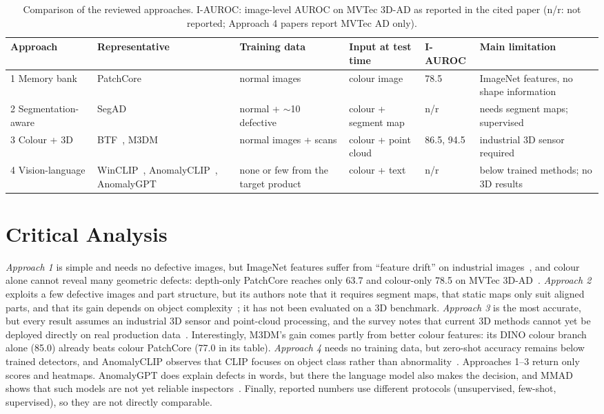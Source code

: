 \documentclass[conference]{IEEEtran}
\begin{document}
\begin{table}[t]
\centering
\caption{Comparison of the reviewed approaches. I-AUROC: image-level AUROC on MVTec 3D-AD as reported in the cited paper (n/r: not reported; Approach 4 papers report MVTec AD only).}
\label{tab:compare}
\footnotesize
\setlength{\tabcolsep}{4pt}
\begin{tabularx}{\textwidth}{@{}p{2.2cm}p{2.6cm}p{2.4cm}p{2.4cm}p{1.3cm}X@{}}
\toprule
Approach & Representative & Training data & Input at test time & I-AUROC & Main limitation \\
\midrule
1 Memory bank & PatchCore~\cite{patchcore} & normal images & colour image & 78.5~\cite{btf} & ImageNet features, no shape information \\
2 Segmentation-aware & SegAD~\cite{segad} & normal + $\sim$10 defective & colour + segment map & n/r & needs segment maps; supervised \\
3 Colour + 3D & BTF~\cite{btf}, M3DM~\cite{m3dm} & normal images + scans & colour + point cloud & 86.5, 94.5 & industrial 3D sensor required \\
4 Vision-language & WinCLIP~\cite{winclip}, AnomalyCLIP~\cite{anomalyclip}, AnomalyGPT~\cite{anomalygpt} & none or few from the target product & colour + text & n/r & below trained methods; no 3D results \\
\bottomrule
\end{tabularx}
\end{table}

\section{Critical Analysis}
\emph{Approach 1} is simple and needs no defective images, but ImageNet features suffer from ``feature drift'' on industrial images~\cite{survey}, and colour alone cannot reveal many geometric defects: depth-only PatchCore reaches only 63.7 and colour-only 78.5 on MVTec 3D-AD~\cite{btf}. \emph{Approach 2} exploits a few defective images and part structure, but its authors note that it requires segment maps, that static maps only suit aligned parts, and that its gain depends on object complexity~\cite{segad}; it has not been evaluated on a 3D benchmark. \emph{Approach 3} is the most accurate, but every result assumes an industrial 3D sensor and point-cloud processing, and the survey notes that current 3D methods cannot yet be deployed directly on real production data~\cite{survey}. Interestingly, M3DM's gain comes partly from better colour features: its DINO colour branch alone (85.0) already beats colour PatchCore (77.0 in its table). \emph{Approach 4} needs no training data, but zero-shot accuracy remains below trained detectors, and AnomalyCLIP observes that CLIP focuses on object class rather than abnormality~\cite{anomalyclip}. Approaches 1--3 return only scores and heatmaps. AnomalyGPT does explain defects in words, but there the language model also makes the decision, and MMAD shows that such models are not yet reliable inspectors~\cite{mmad}. Finally, reported numbers use different protocols (unsupervised, few-shot, supervised), so they are not directly comparable.
\end{document}
